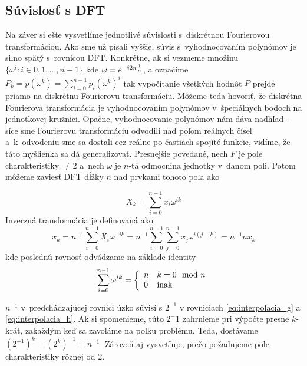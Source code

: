 \subsection{Súvislosť s DFT}
Na záver si ešte vysvetlíme jednotlivé súvislosti s~diskrétnou
Fourierovou transformáciou. Ako sme už písali vyššie, súvis
s~vyhodnocovaním polynómov je silno spätý s~rovnicou DFT.
Konkrétne, ak si vezmeme množinu 
$\{ \omega^i: i \in 0,1,\dots,n-1\}$ kde $\omega = e^{-\hat{\imath} 2 \pi
\frac{1}{n}}$, 
a označíme $P_k = p(\omega^k) = \sum_{i=0}^{n-1} p_i (\omega^k)^i$
tak vypočítanie všetkých hodnôt $P$ prejde priamo na diskrétnu Fourierovu
transformáciu. Môžeme teda hovoriť, že diskrétna Fourierova
transformácia je vyhodnocovaním polynómov v~špeciálnych bodoch na
jednotkovej kružnici. Opačne, vyhodnocovanie polynómov nám dáva
nadhľad - síce sme Fourierovu transformáciu odvodili nad poľom
reálnych čísel a~k~odvodeniu sme sa dostali cez reálne po častiach
spojité funkcie, vidíme, že táto myšlienka sa dá generalizovať.
Presnejšie povedané, nech $F$ je pole charakteristiky $\not=2$ a~nech
$\omega$ je $n$-tá odmocnina jednotky v~danom poli.
Potom môžeme zaviesť DFT dĺžky $n$ nad prvkami tohoto poľa ako

\begin{equation*}
    X_k = \sum_{i=0}^{n-1} x_i \omega^{ik}
\end{equation*}
Inverzná transformácia je definovaná ako
\begin{equation*}
    x_k = n^{-1} \sum_{i=0}^{n-1} X_i \omega^{-ik}
        = n^{-1} \sum_{i=0}^{n-1} \sum_{j=0}^{n-1} 
            x_j \omega^{i(j-k)}
        = n^{-1} n x_k
\end{equation*}
kde poslednú rovnosť odvádzame na základe identity
\begin{equation*}
    \sum_{i=0}^{n-1} \omega^{ik} = \left\{
        \begin{array}{l l}
            n& k=0 \mod n\\
            0& \text{inak}
        \end{array}
        \right.
\end{equation*}
\begin{poznamka}
    $n^{-1}$ v~predchádzajúcej rovnici úzko súvisí s $2^{-1}$ v rovniciach
    \eqref{eq:interpolacia_g} a \eqref{eq:interpolacia_h}. Ak si
    spomenieme, túto $2^-1$ zahrnieme pri výpočte presne $k$-krát,
    zakaždým keď sa zavoláme na polku problému. Teda, dostávame
    $(2^{-1})^k = (2^k)^{-1} = n^{-1}$. Zároveň aj vysvetľuje, prečo
    požadujeme pole charakteristiky rôznej od 2.
\end{poznamka}

\nocite{pollard}
\nocite{compalg}
\nocite{practical_fast_multiplication}
